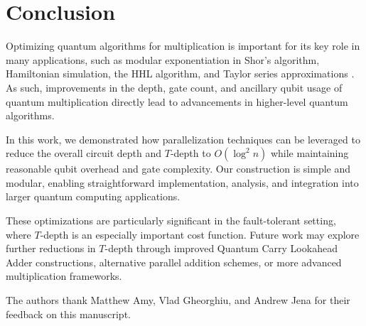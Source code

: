\documentclass[reprint,amsmath,amssymb,aps,pra]{revtex4-2}
\begin{document}
\section{Conclusion}

Optimizing quantum algorithms for multiplication is important for its key role in many applications, such as modular exponentiation in Shor's algorithm, Hamiltonian simulation, the HHL algorithm, and Taylor series approximations \cite{Shor1997, pavlidis2013fastquantummodularexponentiation, Harrow_2009, Childs_2017, Berry_2015}. As such, improvements in the depth, gate count, and ancillary qubit usage of quantum multiplication directly lead to advancements in higher-level quantum algorithms.

In this work, we demonstrated how parallelization techniques can be leveraged to reduce the overall circuit depth and $T$-depth to $O(\log^2 n)$ while maintaining reasonable qubit overhead and gate complexity. Our construction is simple and modular, enabling straightforward implementation, analysis, and integration into larger quantum computing applications.

These optimizations are particularly significant in the fault-tolerant setting, where $T$-depth is an especially important cost function. Future work may explore further reductions in $T$-depth through improved Quantum Carry Lookahead Adder constructions, alternative parallel addition schemes, or more advanced multiplication frameworks.


\begin{acknowledgments}
The authors thank Matthew Amy, Vlad Gheorghiu, and Andrew Jena for their feedback on this manuscript.
\end{acknowledgments}

\end{document}
